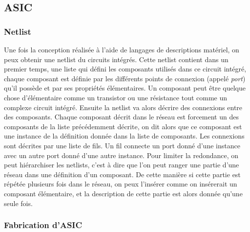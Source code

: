 \subsection{ASIC}

\subsubsection{Netlist} Une fois la conception réalisée à l'aide de langages de
descriptions matériel, on peux obtenir une netlist du circuits intégrés. Cette
netlist contient dans un premier temps, une liste qui défini les composants utilisés
dans ce circuit intégré, chaque composant est définie par les différents points de
connexion (appelé \textit{port}) qu'il possède et par ses propriétés élémentaires. Un
composant peut être quelque chose d'élémentaire comme un transistor ou une résistance
tout comme un complexe circuit intégré. Ensuite la netlist va alors décrire des
connexions entre des composants. Chaque composant décrit dans le réseau est forcement
un des composants de la liste précédemment décrite, on dit alors que ce composant est
une instance de la définition donnée dans la liste de composants. Les connexions sont
décrites par une liste de fils. Un fil connecte un port donné d'une instance avec un
autre port donné d'une autre instance. Pour limiter la redondance, on peut
hiérarchiser les netlists, c'est à dire que l'on peut ranger une partie d'une réseau
dans une définition d'un composant. De cette manière si cette partie est répétée
plusieurs fois dans le réseau, on peux l'insérer comme on insérerait un composant
élémentaire, et la description de cette partie est alors donnée qu'une seule fois.

\subsubsection{Fabrication d'ASIC}

